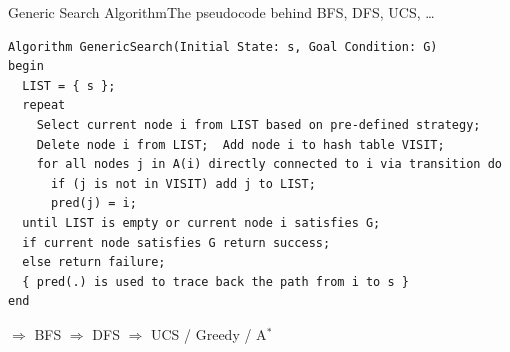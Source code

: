 \documentclass[aspectratio=169,11pt]{beamer}
\begin{document}
\begin{frame}[fragile]{Generic Search Algorithm}{The pseudocode behind BFS, DFS, UCS, \ldots}
\begin{lstlisting}[language={}, basicstyle=\ttfamily\scriptsize, numbers=none,
                   xleftmargin=0.5em, framexleftmargin=0.5em]
Algorithm GenericSearch(Initial State: s, Goal Condition: G)
begin
  LIST = { s };
  repeat
    Select current node i from LIST based on pre-defined strategy;
    Delete node i from LIST;  Add node i to hash table VISIT;
    for all nodes j in A(i) directly connected to i via transition do
      if (j is not in VISIT) add j to LIST;
      pred(j) = i;
  until LIST is empty or current node i satisfies G;
  if current node satisfies G return success;
  else return failure;
  { pred(.) is used to trace back the path from i to s }
end
\end{lstlisting}
\centering\scriptsize
{} $\Rightarrow$ BFS \quad {} $\Rightarrow$ DFS \quad
{} $\Rightarrow$ UCS / Greedy / A$^\ast$
\end{frame}
\end{document}
